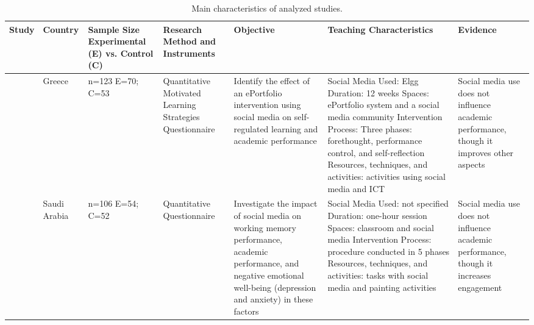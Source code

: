 \documentclass[english]{textolivre}
\begin{document}
\begin{longtable}{p{} p{} p{} p{} p{} p{} p{}}

\caption{Main characteristics of analyzed studies.}\label{tab-3}

\\

\toprule
Study &
Country &
Sample Size Experimental (E) vs. Control (C) &
Research Method and Instruments &
Objective &
Teaching Characteristics &
Evidence
\\
\midrule
\endfirsthead

\textcite{alexiou2020} &
Greece &
n=123\newline
E=70; C=53 &
Quantitative\newline
Motivated Learning Strategies Questionnaire &
Identify the effect of an ePortfolio intervention using social media on self-regulated learning and academic performance &
Social Media Used: Elgg\newline
Duration: 12 weeks\newline
Spaces: ePortfolio system and a social media community\newline
Intervention Process: Three phases: forethought, performance control, and self-reflection\newline
Resources, techniques, and activities: activities using social media and ICT &
Social media use does not influence academic performance, though it improves other aspects
\\

\textcite{almarzouki2022} &
Saudi Arabia &
n=106\newline
E=54; C=52 &
Quantitative Questionnaire &
Investigate the impact of social media on working memory performance, academic performance, and negative emotional well-being (depression and anxiety) in these factors &
Social Media Used: not specified\newline
Duration: one-hour session\newline
Spaces: classroom and social media\newline
Intervention Process: procedure conducted in 5 phases\newline
Resources, techniques, and activities: tasks with social media and painting activities &
Social media use does not influence academic performance, though it increases engagement
\\


\end{longtable}
\end{document}
